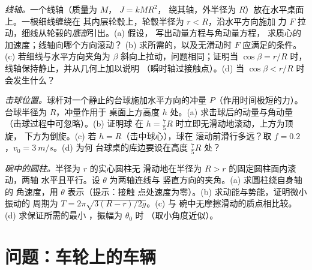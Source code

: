 \begin{exercise}[$\star\star\star$]\label{exo:b2:rigid-body-mechanics:10}
\emph{线轴。}一个线轴（质量为 $M$， $J = kMR^2$，
绕其轴，外半径为 $R$）放在水平桌面上。一根细线缠绕在
其内层轮毂上，轮毂半径为 $r < R$，沿水平方向施加
力 $F$ 拉动，细线从轮毂的\emph{底部}引出。(a) 假设，
写出动量方程与角动量方程，
求质心的加速度；线轴向哪个方向滚动？
(b) 求所需的，以及无滑动时 $F$ 应满足的条件。
(c) 若细线与水平方向夹角为
$\beta$ 斜向上拉动，问题相同；证明当
$\cos\beta = r/R$ 时，线轴保持静止，并从几何上加以说明
（瞬时轴过接触点）。(d) 当 $\cos\beta < r/R$ 时会发生什么？
\end{exercise}

\begin{exercise}[$\star\star\star$]\label{exo:b2:rigid-body-mechanics:11}
\emph{击球位置。}球杆对一个静止的台球施加水平方向的冲量
$P$（作用时间极短的力）。台球半径为 $R$，冲量作用于
桌面上方高度 $h$ 处。(a) 求击球后的动量与角动量
（击球过程中可忽略）。(b) 证明球
在 $h = \tfrac75R$ 时立即无滑动地滚动，上方为顶旋，
下方为倒旋。(c) 若 $h = R$（击中球心），球在
滚动前滑行多远？取 $f = 0.2$，$v_0 = \qty{3}{m/s}$。(d) 为何
台球桌的库边要设在高度 $\tfrac75R$ 处？
\end{exercise}

\begin{exercise}[$\star\star\star$]\label{exo:b2:rigid-body-mechanics:12}
\emph{碗中的圆柱。}半径为 $r$ 的实心圆柱无
滑动地在半径为 $R > r$ 的固定圆柱面内滚动，两轴
水平且平行。设 $\theta$ 为两轴连线与
竖直方向的夹角。(a) 求圆柱绕自身轴的
角速度，用 $\dot\theta$ 表示（提示：接触
点处速度为零）。(b) 求动能与势能，证明微小振动的
周期为 $T = 2\pi\sqrt{3(R - r)/2g}$。(c) 与
碗中无摩擦滑动的质点相比较。(d) 求保证所需的最小
，振幅为 $\theta_0$ 时
（取小角度近似）。
\end{exercise}

\section{问题：车轮上的车辆}

